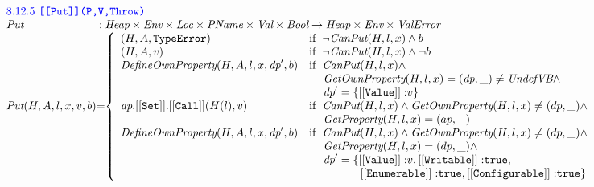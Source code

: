 \[\begin{array}{l@{}c@{}l}
\multicolumn{3}{l}{\mbox{\inblue 8.12.5 {\tt [[Put]](P,V,Throw)}}}\\
\hf{Put} & :& \Heap \times \Env \times \Loc \times \Prop \times \Val \times \Bool
\rightarrow \Heap \times \Env \times \ValError \\
\hf{Put}(H,A,l,x,v,b) &=&
\left\{\begin{array}{ll}
(H, A, \te) & \ifc{\neg\hf{CanPut}(H,l,x)\wedge b} \\
(H, A, v) & \ifc{\neg\hf{CanPut}(H,l,x)\wedge \neg b} \\
\hf{DefineOwnProperty}(H,A,l,x,\emph{dp}',b)
&\ifc{\hf{CanPut}(H,l,x)\wedge}\\
&\mbox{\phantom{if \ }$\hf{GetOwnProperty}(H,l,x) = (\emph{dp}, \_)\not=\UndefVB\wedge$}\\
&\mbox{\phantom{if \ }$\emph{dp}' = \{{\tt[[Value]]:}v\}$}\\
\emph{ap}.{\tt[[Set]]}.{\tt[[Call]]}(H(l), v)
&\ifc{\hf{CanPut}(H,l,x)\wedge\hf{GetOwnProperty}(H,l,x) \not= (dp, \_)\wedge}\\
&\mbox{\phantom{if \ }$\hf{GetProperty}(H,l,x) = (ap, \_)$}\\
\hf{DefineOwnProperty}(H,A,l,x,\emph{dp}',b)
&\ifc{\hf{CanPut}(H,l,x)\wedge\hf{GetOwnProperty}(H,l,x) \not= (dp, \_)\wedge}\\
&\mbox{\phantom{if \ }$\hf{GetProperty}(H,l,x) = (dp, \_)\wedge$}\\
&\mbox{\phantom{if \ }$\emph{dp}' = \{{\tt[[Value]]:}v, {\tt[[Writable]]:}\true,$}\\
&\mbox{\phantom{if \ \emph{dp}' = \{}${\tt[[Enumerable]]:}\true,
 {\tt[[Configurable]]:}\true\}$}
\end{array}\right.
\\\\

\end{array}
\]

